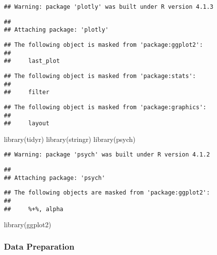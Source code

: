 \documentclass[
]{article}
\newenvironment{Shaded}{\begin{snugshade}}{\end{snugshade}}
\newcommand{\FunctionTok}[1]{\textcolor[rgb]{0.00,0.00,0.00}{#1}}
\newcommand{\NormalTok}[1]{#1}
\begin{document}
\begin{verbatim}
## Warning: package 'plotly' was built under R version 4.1.3
\end{verbatim}

\begin{verbatim}
## 
## Attaching package: 'plotly'
\end{verbatim}

\begin{verbatim}
## The following object is masked from 'package:ggplot2':
## 
##     last_plot
\end{verbatim}

\begin{verbatim}
## The following object is masked from 'package:stats':
## 
##     filter
\end{verbatim}

\begin{verbatim}
## The following object is masked from 'package:graphics':
## 
##     layout
\end{verbatim}

\begin{Shaded}
\begin{Highlighting}[]
\FunctionTok{library}\NormalTok{(tidyr)}
\FunctionTok{library}\NormalTok{(stringr)}
\FunctionTok{library}\NormalTok{(psych)}
\end{Highlighting}
\end{Shaded}

\begin{verbatim}
## Warning: package 'psych' was built under R version 4.1.2
\end{verbatim}

\begin{verbatim}
## 
## Attaching package: 'psych'
\end{verbatim}

\begin{verbatim}
## The following objects are masked from 'package:ggplot2':
## 
##     %+%, alpha
\end{verbatim}

\begin{Shaded}
\begin{Highlighting}[]
\FunctionTok{library}\NormalTok{(ggplot2)}
\end{Highlighting}
\end{Shaded}

\hypertarget{data-preparation}{%
\subsubsection{Data Preparation}\label{data-preparation}}
\end{document}
